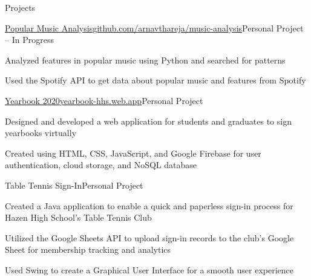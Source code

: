 \documentclass{resume} %
\begin{document}
\begin{rSection}{Projects}

\begin{project}{\href{https://github.com/arnavthareja/music-analysis}{Popular Music Analysis}}{\href{https://github.com/arnavthareja/music-analysis}{github.com/arnavthareja/music-analysis}}{Personal Project – In Progress}
\item Analyzed features in popular music using Python and searched for patterns
\item Used the Spotify API to get data about popular music and features from Spotify
\end{project}

\begin{project}{\href{https://yearbook-hhs.web.app/}{Yearbook 2020}}{\href{https://yearbook-hhs.web.app/}{yearbook-hhs.web.app}}{Personal Project}
\item Designed and developed a web application for students and graduates to sign yearbooks virtually
\item Created using HTML, CSS, JavaScript, and Google Firebase for user authentication, cloud storage, and NoSQL database
\end{project}

\begin{project}{Table Tennis Sign-In}{}{Personal Project}
\item Created a Java application to enable a quick and paperless sign-in process for Hazen High School's Table Tennis Club
\item Utilized the Google Sheets API to upload sign-in records to the club's Google Sheet for membership tracking and analytics
\item Used Swing to create a Graphical User Interface for a smooth user experience
\end{project}


\end{rSection}

\end{document}
